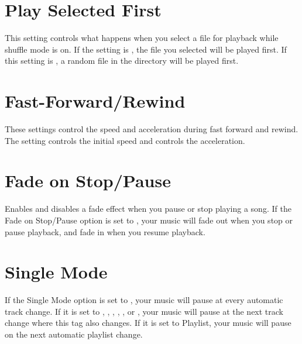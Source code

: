 \section{Play Selected First}
  This setting controls what happens when you
  select a file for playback while shuffle mode is on. If the
   setting is , the file you
  selected will be played first. If this setting is , a random
  file in the directory will be played first.

\section{Fast-Forward/Rewind}
  These settings control the speed and acceleration during fast forward and rewind.
  The setting  controls the initial speed and  controls the acceleration.


\section{Fade on Stop/Pause}
  Enables and disables a fade effect when you
  pause or stop playing a song. If the Fade on Stop/Pause option is
  set to , your music will fade out when you stop or pause 
  playback, and fade in when you resume playback.
    
\section{Single Mode}
  If the Single Mode  option is  set to , your music
  will pause at every automatic track change.
  If it is set to , , ,
  , , or ,
  your music will pause at the next track change where this tag also
  changes.
  If it is set to Playlist, your music will pause on the next automatic playlist change.

